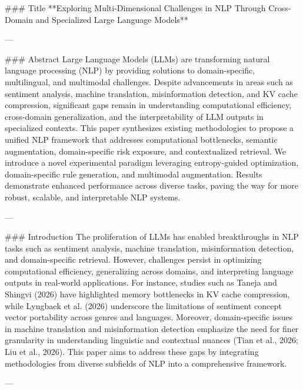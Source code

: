 ### Title  
**Exploring Multi-Dimensional Challenges in NLP Through Cross-Domain and Specialized Large Language Models**

---

### Abstract  
Large Language Models (LLMs) are transforming natural language processing (NLP) by providing solutions to domain-specific, multilingual, and multimodal challenges. Despite advancements in areas such as sentiment analysis, machine translation, misinformation detection, and KV cache compression, significant gaps remain in understanding computational efficiency, cross-domain generalization, and the interpretability of LLM outputs in specialized contexts. This paper synthesizes existing methodologies to propose a unified NLP framework that addresses computational bottlenecks, semantic augmentation, domain-specific risk exposure, and contextualized retrieval. We introduce a novel experimental paradigm leveraging entropy-guided optimization, domain-specific rule generation, and multimodal augmentation. Results demonstrate enhanced performance across diverse tasks, paving the way for more robust, scalable, and interpretable NLP systems.

---

### Introduction  
The proliferation of LLMs has enabled breakthroughs in NLP tasks such as sentiment analysis, machine translation, misinformation detection, and domain-specific retrieval. However, challenges persist in optimizing computational efficiency, generalizing across domains, and interpreting language outputs in real-world applications. For instance, studies such as Taneja and Shingvi (2026) have highlighted memory bottlenecks in KV cache compression, while Lyngbaek et al. (2026) underscore the limitations of sentiment concept vector portability across genres and languages. Moreover, domain-specific issues in machine translation and misinformation detection emphasize the need for finer granularity in understanding linguistic and contextual nuances (Tian et al., 2026; Liu et al., 2026). This paper aims to address these gaps by integrating methodologies from diverse subfields of NLP into a comprehensive framework.  

---

